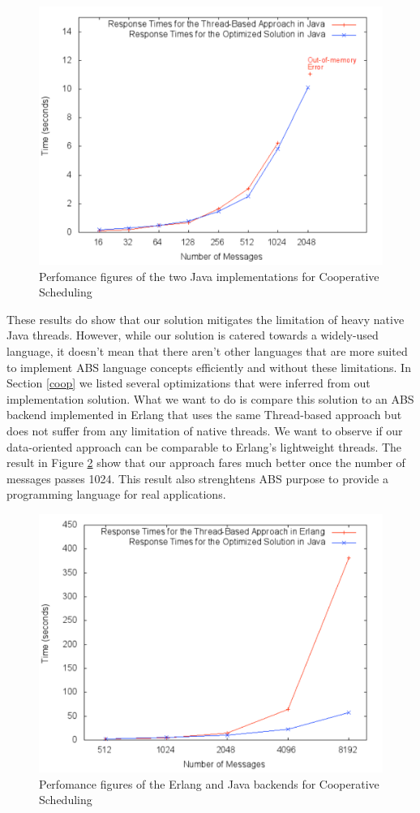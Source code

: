 \begin{figure}
	\label{bench:jj}
	\centering
	\includegraphics[scale=0.8]{jaj8}
	\caption{Perfomance figures of the two Java implementations for Cooperative Scheduling}
\end{figure}

\par These results do show that our solution mitigates the limitation of heavy native Java threads. However, while our solution is catered towards a widely-used language, it doesn't mean that there aren't other languages that are more suited to implement ABS language concepts efficiently and without these limitations. In Section \ref{coop} we listed several optimizations that were inferred from out implementation solution. What we want to do is compare this solution to an ABS backend implemented in Erlang that uses the same Thread-based approach but does not suffer from any limitation of native threads. We want to observe if our data-oriented approach can be comparable to Erlang's lightweight threads. The result in Figure \ref{bench:ej} show that our approach fares much better once the number of messages passes 1024. This result also strenghtens ABS purpose to provide a programming language for real applications.

\begin{figure}
	\label{bench:ej}
	\centering
	\includegraphics[scale=0.8]{erlj8}
	\caption{Perfomance figures of the Erlang and Java backends for Cooperative Scheduling}
\end{figure}




